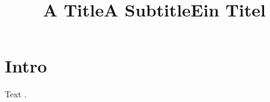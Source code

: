 \documentclass{ceurart}
\title[mode=title]{A Title}
\title[mode=sub]{A Subtitle}
\title[mode = trans]{Ein Titel}
\begin{document}
\maketitle
\section{Intro}
Text \ceurextra.
\end{document}
